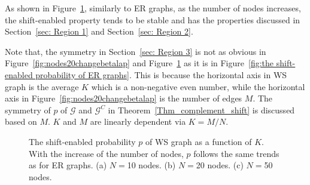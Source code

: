 \documentclass[journal]{IEEEtran}
\begin{document}
As shown in Figure~\ref{fig:Watt_change_node}, similarly to ER graphs, as the number of nodes increases, the shift-enabled property tends to be stable and has the properties discussed in Section~\ref{sec: Region 1} and Section~\ref{sec: Region 2}. %
\begin{Rem}
Note that, the symmetry in Section~\ref{sec: Region 3} is not as obvious in Figure~\ref{fig:nodes20changebetalap} and  Figure~\ref{fig:Watt_change_node} as it is in Figure~\ref{fig:the shift-enabled probability of ER graphs}. This is because the horizontal axis in WS graph is the average $K$ which is a non-negative even number, while the horizontal axis in Figure~\ref{fig:nodes20changebetalap}
is the number of edges $M$. The symmetry of $p$ of $\mathcal{G}$ and $\mathcal{G}^C$ in Theorem~\ref{Thm_complement_shift} is discussed based on $M$. $K$ and $M$ are linearly dependent via $K=M/N$.
\end{Rem}

\begin{figure}[htb]
	\centering
	\centering
	\centering
	\caption{The shift-enabled probability $p$ of WS graph as a function of $K$. With the increase of the number of nodes, $p$ follows the same trends as for ER graphs. (a) $N=$10 nodes. 
		(b) $N=$20 nodes. (c) $N=$50 nodes. 
	}
	\label{fig:Watt_change_node}
\end{figure}
\end{document}
